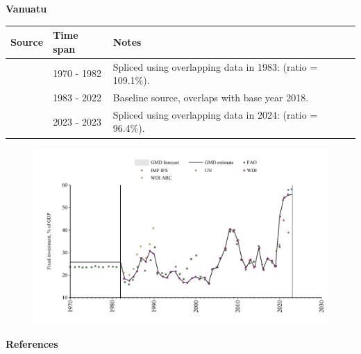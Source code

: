 \documentclass[12pt,a4paper,landscape]{article}
\begin{document}
\begin{adjustbox}{max totalsize={\paperwidth}{\paperheight},center}
\begin{minipage}[t][\textheight][t]{\textwidth}
\vspace*{0.5cm}
{}
\begin{center}
{\Large\bfseries Vanuatu}
\end{center}
\vspace{0.5cm}
\begin{table}[H]
\centering
\small
\begin{tabular}{|l|l|l|}
\hline
\textbf{Source} & \textbf{Time span} & \textbf{Notes} \\
\hline
\rowcolor{white}\cite{UN}& 1970 - 1982 &Spliced using overlapping data in 1983: (ratio = 109.1\%).\\
\rowcolor{lightgray}\cite{WDI}& 1983 - 2022 &Baseline source, overlaps with base year 2018.\\
\rowcolor{white}\cite{FAO}& 2023 - 2023 &Spliced using overlapping data in 2024: (ratio = 96.4\%).\\
\hline
\end{tabular}
\end{table}
\begin{figure}[H]
\centering
\includegraphics[width=\textwidth,height=0.6\textheight,keepaspectratio]{graphs/VUT_finv_GDP.pdf}
\end{figure}
\end{minipage}
\end{adjustbox}
{}
\begin{center}
{\Large\bfseries References}
\end{center}
\small


\end{document}
